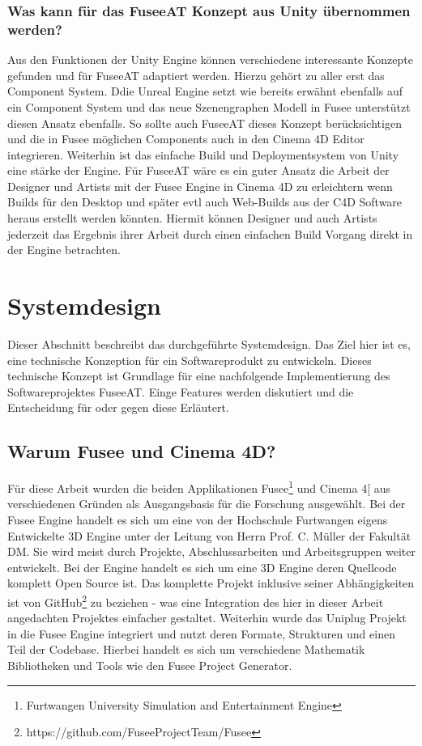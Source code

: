 \documentclass[pagesize, paper=a4, fontsize=12pt, titlepage=true, headings=small, headnosepline, abstractoff, liststotoc, nochapterprefix, plainheadsepline, twoside]{scrreprt}
\newcommand{\CSS}{C\texttt{\# }}
\begin{document}
\subsubsection{Was kann für das FuseeAT Konzept aus Unity übernommen werden?}
Aus den Funktionen der Unity Engine können verschiedene interessante Konzepte gefunden und für FuseeAT adaptiert werden. Hierzu gehört zu aller erst das Component System. Ddie Unreal Engine setzt wie bereits erwähnt ebenfalls auf ein Component System und das neue Szenengraphen Modell in Fusee unterstützt diesen Ansatz ebenfalls. So sollte auch FuseeAT dieses Konzept berücksichtigen und die in Fusee möglichen Components auch in den Cinema 4D Editor integrieren. Weiterhin ist das einfache Build und Deploymentsystem von Unity eine stärke der Engine. Für FuseeAT wäre es ein guter Ansatz die Arbeit der Designer und Artists mit der Fusee Engine in Cinema 4D zu erleichtern wenn Builds für den Desktop und später evtl auch Web-Builds aus der C4D Software heraus erstellt werden könnten. Hiermit können  Designer und auch Artists jederzeit das Ergebnis ihrer Arbeit durch einen einfachen Build Vorgang direkt in der Engine betrachten.


\section{Systemdesign}
Dieser Abschnitt beschreibt das durchgeführte Systemdesign. Das Ziel hier ist es, eine technische Konzeption für ein Softwareprodukt zu entwickeln. Dieses technische Konzept ist Grundlage für eine nachfolgende Implementierung des Softwareprojektes FuseeAT. Einge Features werden diskutiert und die Entscheidung für oder gegen diese Erläutert.

\subsection{Warum Fusee und Cinema 4D?}
Für diese Arbeit wurden die beiden Applikationen Fusee\footnote{Furtwangen University Simulation and Entertainment Engine} und Cinema 4[\autocite{MaxonC4d2014} aus verschiedenen Gründen als Ausgangsbasis für die Forschung ausgewählt. Bei der Fusee Engine handelt es sich um eine von der Hochschule Furtwangen eigens Entwickelte 3D Engine unter der Leitung von Herrn Prof. C. Müller der Fakultät DM. Sie wird meist durch Projekte, Abschlussarbeiten und Arbeitsgruppen weiter entwickelt. Bei der Engine handelt es sich um eine 3D Engine deren Quellcode komplett Open Source ist. Das komplette Projekt inklusive seiner Abhängigkeiten ist von GitHub\footnote{https://github.com/FuseeProjectTeam/Fusee} zu beziehen - was eine Integration des hier in dieser Arbeit angedachten Projektes einfacher gestaltet. Weiterhin wurde das Uniplug Projekt in die Fusee Engine integriert und nutzt deren Formate, Strukturen und einen Teil der Codebase. Hierbei handelt es sich um verschiedene Mathematik Bibliotheken und Tools wie den Fusee Project Generator.
\end{document}
